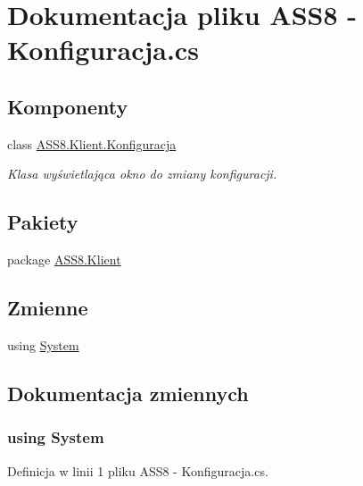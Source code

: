 \hypertarget{a00038}{
\section{Dokumentacja pliku ASS8 - Konfiguracja.cs}
\label{d8/d41/a00038}
}
\subsection*{Komponenty}
\begin{CompactItemize}
\item 
class \hyperlink{a00014}{ASS8.Klient.Konfiguracja}
\begin{CompactList}\small\item\em Klasa wyświetlająca okno do zmiany konfiguracji. \item\end{CompactList}\end{CompactItemize}
\subsection*{Pakiety}
\begin{CompactItemize}
\item 
package \hyperlink{a00060}{ASS8.Klient}
\end{CompactItemize}
\subsection*{Zmienne}
\begin{CompactItemize}
\item 
﻿using \hyperlink{a00038_81a223a02c34d82b47199f08308847f2}{System}
\end{CompactItemize}


\subsection{Dokumentacja zmiennych}
\hypertarget{a00038_81a223a02c34d82b47199f08308847f2}{
\subsubsection[{System}]{\setlength{\rightskip}{0pt plus 5cm}﻿using {\bf System}}}
\label{d8/d41/a00038_81a223a02c34d82b47199f08308847f2}




Definicja w linii 1 pliku ASS8 - Konfiguracja.cs.